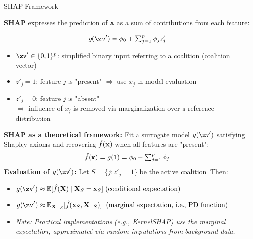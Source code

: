 \documentclass[10pt,compress,t,notes=noshow, xcolor=table]{beamer}
\begin{document}
\begin{frame}{SHAP Framework }

\textbf{SHAP} expresses the prediction of $\mathbf{x}$ as a sum of contributions from each feature:

\[
g(\zv') = \phi_0 + \textstyle\sum_{j=1}^p \phi_j z'_j
\]

\begin{itemize}
  \item $\zv' \in \{0,1\}^p$: simplified binary input referring to a coalition (coalition vector)
  \item \(z'_j = 1\): feature $j$ is "present" $\Rightarrow$ use $x_j$ in model evaluation
  \item \(z'_j = 0\): feature $j$ is "absent"\\$\Rightarrow$ influence of $x_j$ is removed via marginalization over a reference distribution%
\end{itemize}

\pause\medskip

\textbf{SHAP as a theoretical framework:} Fit a surrogate model \( g(\zv') \) satisfying Shapley axioms and recovering $\hat{f}(\mathbf{x})$ when all features are "present":
\[
\hat{f}(\mathbf{x}) = g(\mathbf{1}) = \phi_0 + \textstyle\sum_{j=1}^p \phi_j
\]
\textbf{Evaluation of $g(\zv')$:} Let \( S = \{ j : z'_j = 1 \} \) be the active coalition. Then:
\begin{itemize}
    \item $g(\zv') \approx \mathbb{E}[ \fh(\mathbf{X}) \mid \mathbf{X}_S = \mathbf{x}_S]\;\text{(conditional expectation)}$
    \item $g(\zv') \approx \mathbb{E}_{\mathbf{X}_{-S}} [ \fh(\mathbf{x}_S, \mathbf{X}_{-S}) ] \;\;\text{(marginal expectation, i.e., PD function)}$
    \item\textit{Note: Practical implementations (e.g., KernelSHAP) use the marginal expectation, approximated via random imputations from background data.}
\end{itemize}

\end{frame}
\end{document}
